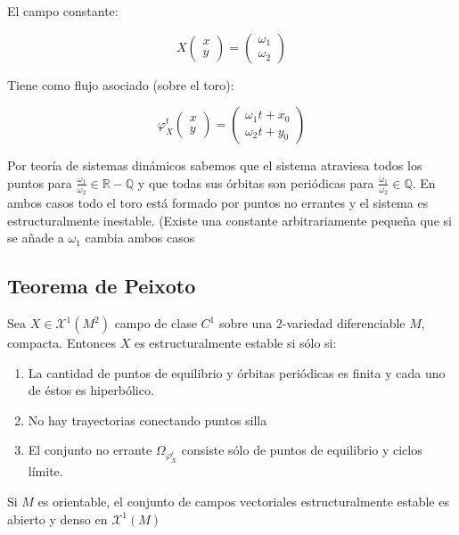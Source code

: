 \begin{exmp}
	El campo constante:
	
	\begin{equation*}
		X\begin{pmatrix}
			x\\
			y
		\end{pmatrix} = \begin{pmatrix}
			\omega_1\\
			\omega_2
		\end{pmatrix}
	\end{equation*} 
	
	Tiene como flujo asociado (sobre el toro):
	
	
	\begin{equation*}
		\varphi_X^t\begin{pmatrix}
			x\\
			y
		\end{pmatrix} = \begin{pmatrix}
			\omega_1t+x_0\\
			\omega_2t+y_0
		\end{pmatrix}
	\end{equation*} 
	
	Por teoría de sistemas dinámicos sabemos que el sistema atraviesa todos los puntos para $\frac{\omega_1}{\omega_2}\in \mathbb{R-Q}$ y que todas sus órbitas son periódicas para $\frac{\omega_1}{\omega_2}\in \mathbb{Q}$. En ambos casos todo el toro está formado por puntos no errantes y el sistema es estructuralmente inestable. (Existe una constante arbitrariamente pequeña que si se añade a $\omega_1$ cambia ambos casos
\end{exmp}

\subsection{Teorema de Peixoto}

\begin{thm}[Peixoto]
	Sea $X\in \mathcal{X}^1(M^2)$ campo de clase $C^1$ sobre una 2-variedad diferenciable $M$, compacta. Entonces $X$ es estructuralmente estable si sólo si:
	
	\begin{enumerate}
		\item La cantidad de puntos de equilibrio y órbitas periódicas es finita y cada uno de éstos es hiperbólico.
		
		\item No hay trayectorias conectando puntos silla
		
		\item El conjunto no errante $\Omega_{\varphi_X^t}$ consiste sólo de puntos de equilibrio y ciclos límite.
	\end{enumerate}
	
	Si $M$ es orientable, el conjunto de campos vectoriales estructuralmente estable es abierto y denso en $\mathcal{X}^1(M)$
\end{thm}

